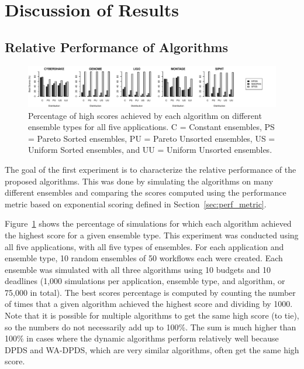 \documentclass[preprint,5p]{elsarticle}
\begin{document}
\section{Discussion of Results}
\label{sec:results}


\subsection{Relative Performance of Algorithms}
\label{sec:relative-performance}


\begin{figure}[tb]
    \centering
    \includegraphics[width=\textwidth]{run-finish-variations-test-0-output-distributions}
    \caption{Percentage of high scores achieved by each algorithm on different ensemble types for all five applications. C = Constant ensembles, PS = Pareto Sorted ensembles, PU = Pareto Unsorted ensembles, US = Uniform Sorted ensembles, and UU = Uniform Unsorted ensembles.} 
    \label{fig:distributions}
\end{figure}




The goal of the first experiment is to characterize the relative performance
of the proposed algorithms. This was done by simulating the algorithms on many
different ensembles and comparing the scores computed using the
performance metric based on exponential scoring defined in
Section~\ref{sec:perf_metric}.

Figure~\ref{fig:distributions} shows the percentage of simulations for which
each algorithm achieved the highest score for a given ensemble type. This
experiment was conducted using all five applications, with all five types of
ensembles. For each application and ensemble type, 10 random ensembles of 50
workflows each were created. Each ensemble was simulated with all three
algorithms using 10 budgets and 10 deadlines (1,000 simulations per
application, ensemble type, and algorithm, or 75,000 in total). The best scores percentage is
computed by counting the number of times that a given algorithm achieved the
highest score and dividing by 1000. Note that it is possible for multiple
algorithms to get the same high score (to tie), so the numbers do not
necessarily add up to 100\%. The sum is much higher than 100\% in cases where
the dynamic algorithms perform relatively well because DPDS and WA-DPDS, which
are very similar algorithms, often get the same high score.
\end{document}
